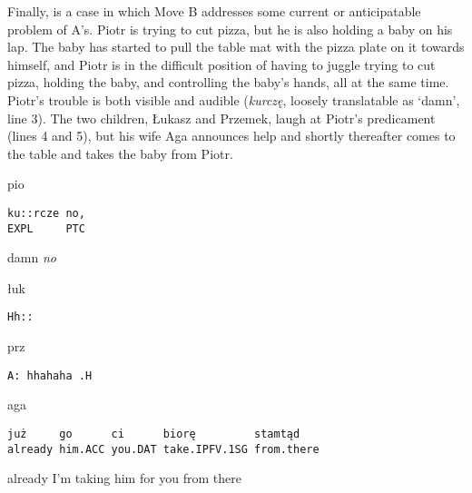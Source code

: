 \documentclass[output=paper]{langsci/langscibook}
\begin{document}
Finally,  is a case in which Move B addresses some current or anticipatable problem of A’s.  Piotr is trying to cut pizza, but he is also holding a baby on his lap.  The baby has started to pull the table mat with the pizza plate on it towards himself, and Piotr is in the difficult position of having to juggle trying to cut pizza, holding the baby, and controlling the baby’s hands, all at the same time.  Piotr’s trouble is both visible and audible (\textit{kurczę}, loosely translatable as `damn', line 3).  The two children, Łukasz and Przemek, laugh at Piotr’s predicament (lines 4 and 5), but his wife Aga announces help and shortly thereafter comes to the table and takes the baby from Piotr.

\vspace{2mm}
%
%
\begin{mdframednoverticalspace}[style=firstfoc]
\end{mdframednoverticalspace}
%
\begin{mdframednoverticalspace}[style=firstfoc]
\begin{transbox}{3}{pio}
\begin{verbatim}
ku::rcze no,
EXPL     PTC
\end{verbatim}
damn \textit{no}
\end{transbox}
\end{mdframednoverticalspace}\vspace{2mm}
%
\begin{transbox}{4}{łuk}
\begin{verbatim}
Hh::
\end{verbatim}
\end{transbox}
%
\begin{transbox}{5}{prz}
\begin{verbatim}
A: hhahaha .H
\end{verbatim}
\end{transbox}
%
\begin{mdframednoverticalspace}[style=secondfoc]
\begin{transbox}{6}{aga}
\begin{verbatim}
już     go      ci      biorę         stamtąd
already him.ACC you.DAT take.IPFV.1SG from.there
\end{verbatim}
already I’m taking him for you from there
\end{transbox}
\end{mdframednoverticalspace}
%
\begin{mdframednoverticalspace}[style=secondfoc]
\end{mdframednoverticalspace}
\end{document}
